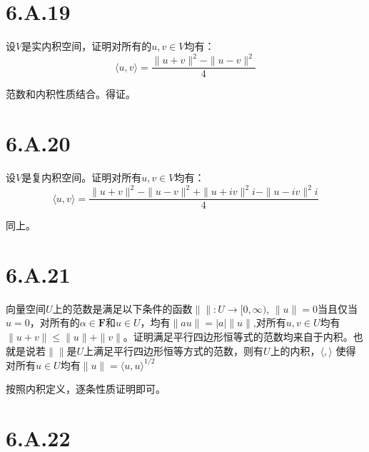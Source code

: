 \documentclass[10pt,a4paper,UTF8]{article}
\begin{document}
\section{6.A.19}
\label{sec:org1706e55}


\begin{tikzproblem}
设\(V\)是实内积空间，证明对所有的\(u,v\in V\)均有：
\begin{equation}
\label{eq:23}
\langle u,v \rangle  = \frac{ \| u+v \|^{2} - \| u-v \|^{2} }{4}
\end{equation}
\end{tikzproblem}

\begin{tikzanswer}
范数和内积性质结合。得证。
\end{tikzanswer}
\section{6.A.20}
\label{sec:orgc425dbc}


\begin{tikzproblem}
设\(V\)是复内积空间。证明对所有\(u,v\in V\)均有：
\begin{equation}
\label{eq:24}
\langle u,v \rangle = \frac{ \| u+v \|^{2} - \| u-v \|^{2} + \| u+iv \|^{2}i - \| u-iv \|^{2}i }{4}
\end{equation}
\end{tikzproblem}
\begin{tikzanswer}
同上。
\end{tikzanswer}
\section{6.A.21}
\label{sec:org8cbf6f4}


\begin{tikzproblem}
向量空间\(U\)上的范数是满足以下条件的函数\(\|  \|: U \to [0,\infty)\), \(\| u \| = 0\)当且仅当\(u = 0\)，对所有的\(\alpha \in \mathbf{F}\)和\(u\in U\)，均有\(\| au \| = |a| \| u \|\),对所有\(u,v\in U\)均有\(\| u+v \| \leq \| u \| + \| v \|\)。证明满足平行四边形恒等式的范数均来自于内积。也就是说若\(\|  \|\)是\(U\)上满足平行四边形恒等方式的范数，则有\(U\)上的内积，\(\langle , \rangle\) 使得对所有\(u\in  U\)均有\(\| u \| = \langle u,u \rangle^{1/2}\)
\end{tikzproblem}
\begin{tikzanswer}
按照内积定义，逐条性质证明即可。
\end{tikzanswer}
\section{6.A.22}
\label{sec:org70bfdc3}
\end{document}
